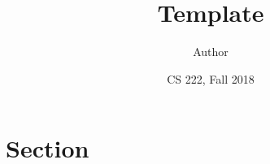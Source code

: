 \documentclass[11pt,letterpaper]{article}
\title{Template}
\author{Author}
\date{CS 222, Fall 2018}
\begin{document}
\maketitle

\section*{Section}



% 
% 
\end{document}
